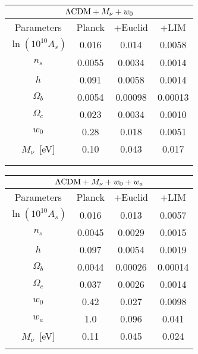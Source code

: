 \documentclass[twocolumn]{aastex631}
\renewcommand{\arraystretch}{1.6}
\begin{document}
\begin{table*}[t]
\begin{center}
\begin{minipage}[t]{0.45\textwidth}
\centering
\renewcommand{\arraystretch}{1.2}
\begin{tabularx}{.85\textwidth}{*{4}{C}} 
\vspace{.04in} \\ 
\hline  
Parameters &  Planck & +Euclid & +LIM \vspace{.04in} \\ 
\hline 
{\boldmath$\ln (10^{10}A_s)$}& 0.016 & 0.014 &0.0058 \\
{\boldmath$n_s$}& 0.0055 & 0.0034 & 0.0014 \\
{\boldmath$h$}& 0.091 & 0.0058& 0.0014 \\
{\boldmath$\Omega_b$}& 0.0054 &  0.00098 & 0.00013\\
{\boldmath$\Omega_c$}& 0.023 & 0.0034 & 0.0010 \\
{\boldmath$w_0$}& 0.28 & 0.018  & 0.0051 \\
{\boldmath$M_\nu$}\ [eV] & 0.10 &0.043 & 0.017 \\ 
& & &  \\ \\
\end{tabularx} 
\end{minipage}
\begin{minipage}[t]{0.45\textwidth}
\centering
\renewcommand{\arraystretch}{1.2}
\begin{tabularx}{.85\textwidth}{*{4}{C}} 
\vspace{.04in} \\ 
\hline 
Parameters &  Planck & +Euclid & +LIM \vspace{.04in} \\ 
\hline 
{\boldmath$\ln (10^{10}A_s)$}&0.016 & 0.013 & 0.0057\\
{\boldmath$n_s$}& 0.0045& 0.0029& 0.0015 \\
{\boldmath$h$}& 0.097&  0.0054 & 0.0019 \\
{\boldmath$\Omega_b$}& 0.0044 & 0.00026 &  0.00014 \\
{\boldmath$\Omega_c$}& 0.037 &  0.0026&  0.0014 \\
{\boldmath$w_0$}& 0.42 & 0.027  & 0.0098\\
{\boldmath$w_a$}&  1.0  &  0.096 &  0.041 \\
{\boldmath$M_\nu$}\ [eV] & 0.11  &  0.045 & 0.024 \\ \\
\end{tabularx}
\end{minipage}
\vspace{.1in}
 \end{center}
 \label{tab:1sig}
\end{table*}
\end{document}
